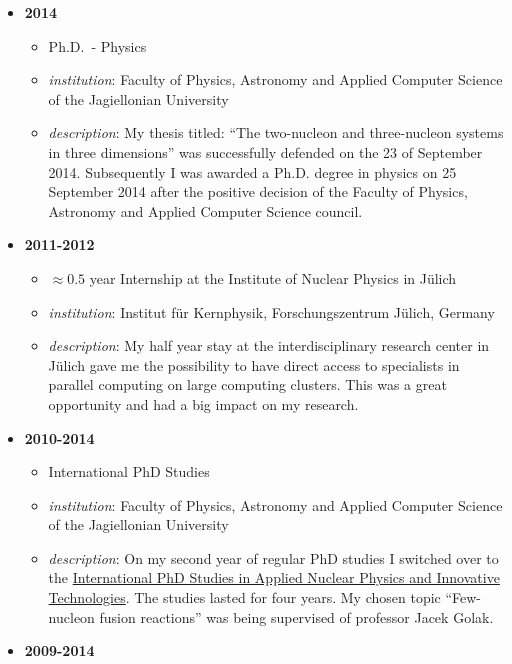 \begin{itemize}
\tightlist
\item
  \textbf{2014}

  \begin{itemize}
  \tightlist
  \item
    Ph.D.~- Physics
  \item
    \emph{institution}: Faculty of Physics, Astronomy and Applied
    Computer Science of the Jagiellonian University
  \item
    \emph{description}: My thesis titled: ``The two-nucleon and
    three-nucleon systems in three dimensions'' was successfully
    defended on the 23 of September 2014. Subsequently I was awarded a
    Ph.D. degree in physics on 25 September 2014 after the positive
    decision of the Faculty of Physics, Astronomy and Applied Computer
    Science council.
  \end{itemize}
\item
  \textbf{2011-2012}

  \begin{itemize}
  \tightlist
  \item
    \(\approx 0.5\) year Internship at the Institute of Nuclear Physics
    in Jülich
  \item
    \emph{institution}: Institut für Kernphysik, Forschungszentrum
    Jülich, Germany
  \item
    \emph{description}: My half year stay at the interdisciplinary
    research center in Jülich gave me the possibility to have direct
    access to specialists in parallel computing on large computing
    clusters. This was a great opportunity and had a big impact on my
    research.
  \end{itemize}
\item
  \textbf{2010-2014}

  \begin{itemize}
  \tightlist
  \item
    International PhD Studies
  \item
    \emph{institution}: Faculty of Physics, Astronomy and Applied
    Computer Science of the Jagiellonian University
  \item
    \emph{description}: On my second year of regular PhD studies I
    switched over to the
    \href{https://fais.uj.edu.pl/applied-nuclear-physics-and-innovative-technologies}{International
    PhD Studies in Applied Nuclear Physics and Innovative Technologies}.
    The studies lasted for four years. My chosen topic ``Few-nucleon
    fusion reactions'' was being supervised of professor Jacek Golak.
  \end{itemize}
\item
  \textbf{2009-2014}


\end{itemize}
